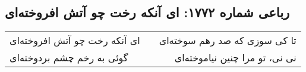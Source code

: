 \begin{center}
\section*{رباعی شماره ۱۷۷۲: ای آنکه رخت چو آتش افروخته‌ای}
\label{sec:1772}
\begin{longtable}{l p{0.5cm} r}
ای آنکه رخت چو آتش افروخته‌ای
&&
تا کی سوزی که صد رهم سوخته‌ای
\\
گوئی به رخم چشم بردوخته‌ای
&&
نی نی، تو مرا چنین نیاموخته‌ای
\\
\end{longtable}
\end{center}
